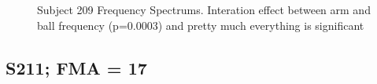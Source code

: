\documentclass{article}
\begin{document}
\begin{figure}[!ht]
	\caption{Subject 209 Frequency Spectrums. Interation effect between arm and ball frequency (p=0.0003) and pretty much everything is significant}%
\end{figure}


\clearpage
\subsection{S211; FMA = 17}
\end{document}

